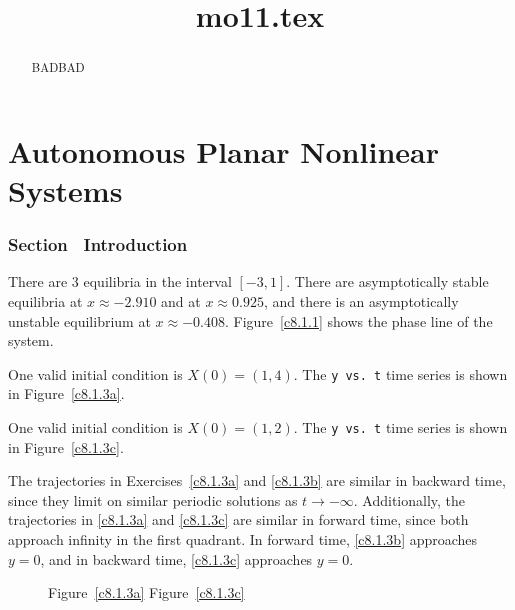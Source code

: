 \documentclass{ximera}
\title{mo11.tex}
\begin{document}
\begin{abstract}
BADBAD
\end{abstract}
\maketitle

\chapter{Autonomous Planar Nonlinear Systems}

\subsection*{Section~\protect{\ref{S:introAPNS}} Introduction}

There are 3 equilibria in the interval $[-3,1]$.  There are
asymptotically stable equilibria at $x\approx -2.910$ and at 
$x\approx 0.925$, and there is an asymptotically unstable equilibrium at
$x \approx -0.408$.  Figure~\ref{c8.1.1} shows the phase line
of the system.

\begin{figure}[htb]
                       \centerline{%
                       }
\end{figure}

One valid initial condition is $X(0) = (1,4)$.  The {\tt y vs.\ t}
time series is shown in Figure~\ref{c8.1.3a}.

 One valid initial condition is $X(0) = (1,2)$.  The
{\tt y vs.\ t} time series is shown in Figure~\ref{c8.1.3c}.

\para The trajectories in Exercises~\ref{c8.1.3a} and \ref{c8.1.3b} are
similar in backward time, since they limit on similar periodic
solutions as $t \rightarrow -\infty$.  Additionally, the trajectories
in \ref{c8.1.3a} and \ref{c8.1.3c} are similar in forward time, since
both approach infinity in the first quadrant.  In forward time,
\ref{c8.1.3b} approaches $y = 0$, and in backward time, \ref{c8.1.3c}
approaches $y = 0$.

\begin{figure}[htb]
                       \centerline{%
                       }
		\centerline{Figure~\ref{c8.1.3a}\hspace{2.1in}
Figure~\ref{c8.1.3c}}
\end{figure}
\end{document}
